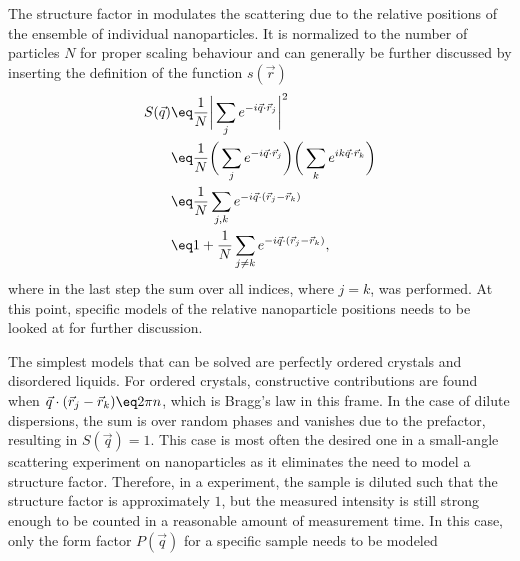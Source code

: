 \documentclass[\main/dresen_thesis.tex]{subfiles}
\begin{document}
    The structure factor in  modulates the scattering due to the relative positions of the ensemble of individual nanoparticles.
    It is normalized to the number of particles $N$ for proper scaling behaviour and can generally be further discussed by inserting the definition of the function $s(\vec{r})$
    \begin{align}
      \begin{split}
        S(\vec{q}) &\eq \frac{1}{N} \bigg| \sum_j  e^{-i\vec{q} \cdot \vec{r}_j} \bigg|^2\\
        &\eq \frac{1}{N}  \bigg( \sum_j  e^{-i\vec{q} \cdot \vec{r}_j} \bigg) \bigg( \sum_k  e^{i k\vec{q} \cdot \vec{r}_k} \bigg)\\
        &\eq \frac{1}{N}  \sum_{j, k}  e^{-i\vec{q} \cdot (\vec{r}_j - \vec{r}_k) }\\
        &\eq 1 + \frac{1}{N}  \sum_{j \neq k}  e^{-i\vec{q} \cdot (\vec{r}_j - \vec{r}_k)},\label{eq:theoreticalBackground:scattering:scatteringTheory:structureFactor}
      \end{split}
    \end{align}
    where in the last step the sum over all indices, where $j=k$, was performed.
    At this point, specific models of the relative nanoparticle positions needs to be looked at for further discussion.

    The simplest models that can be solved are perfectly ordered crystals and disordered liquids.
    For ordered crystals, constructive contributions are found when $\vec{q} \cdot (\vec{r}_j - \vec{r}_k) \eq 2 \pi n$, which is Bragg's law in this frame.
    In the case of dilute dispersions, the sum is over random phases and vanishes due to the prefactor, resulting in $S(\vec{q}) = 1$.
    This case is most often the desired one in a small-angle scattering experiment on nanoparticles as it eliminates the need to model a structure factor.
    Therefore, in a experiment, the sample is diluted such that the structure factor is approximately $1$, but the measured intensity is still strong enough to be counted in a reasonable amount of measurement time.
    In this case, only the form factor $P(\vec{q})$ for a specific sample needs to be modeled
\end{document}
